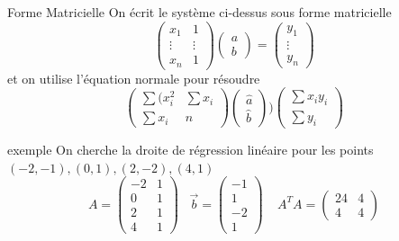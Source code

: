         \begin{parag}{Forme Matricielle}
            On écrit le système ci-dessus sous forme matricielle 
            \[\begin{pmatrix}
                x_1  & 1 \\ \vdots & \vdots \\ x_n & 1
            \end{pmatrix}\begin{pmatrix}
                a \\ b
            \end{pmatrix} = \begin{pmatrix}
                y_1 \\ \vdots \\ y_n
            \end{pmatrix}\]
            et on utilise l'équation normale pour résoudre 
            \[\begin{pmatrix}
                \sum (x_i^2 & \sum x_i\\
                \sum x_i & n
            \end{pmatrix}\begin{pmatrix}
                \hat{a}\\ \hat{b}
            \end{pmatrix} ) \begin{pmatrix}
                \sum x_iy_i \\ \sum y_i
            \end{pmatrix}\]
            \begin{subparag}{exemple}
                On cherche la droite de régression linéaire pour les points $(-2, -1), (0, 1), (2, -2), (4, 1)$
                \[A  = \begin{pmatrix}
                    -2 & 1 \\ 0 & 1 \\ 2 & 1 \\ 4 & 1
                \end{pmatrix} \; \; \; \vec{b} = \begin{pmatrix}
                    -1 \\ 1 \\-2\\ 1
                \end{pmatrix} \; \; \; \; A^T A= \begin{pmatrix}
                    24 & 4 \\ 4 & 4
                \end{pmatrix}\]
                \begin{align*}

\end{align*}
\end{subparag}
\end{parag}
